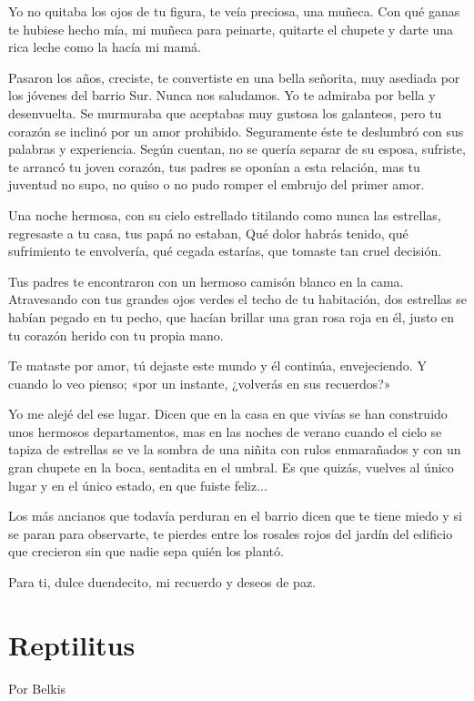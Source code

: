 \documentclass[11pt,twoside,openright,a5paper]{book}
\begin{document}
Yo no quitaba los ojos de tu figura, te veía preciosa, una muñeca. Con qué ganas te hubiese hecho mía, mi muñeca para peinarte, quitarte el chupete y darte una rica leche como la hacía mi mamá.

Pasaron los años, creciste, te convertiste en  una bella señorita, muy asediada por los jóvenes del barrio Sur. Nunca nos saludamos. Yo te admiraba por bella y desenvuelta. Se murmuraba que aceptabas muy gustosa los galanteos, pero tu corazón se inclinó por un amor prohibido. Seguramente éste te deslumbró con sus palabras y experiencia. Según cuentan, no se quería separar de su esposa, sufriste, te arrancó tu joven corazón, tus padres se oponían a esta relación, mas tu juventud no supo, no quiso o no pudo romper el embrujo del primer amor.

Una noche hermosa, con su cielo estrellado titilando como nunca las estrellas, regresaste a tu casa, tus papá no estaban, Qué dolor habrás tenido, qué sufrimiento te envolvería, qué cegada estarías, que tomaste tan cruel decisión.

Tus padres te encontraron con un hermoso camisón blanco en la cama. Atravesando con tus grandes ojos verdes el techo de tu habitación, dos estrellas se habían pegado en tu pecho, que hacían brillar una gran rosa roja en él, justo en tu corazón herido con tu propia mano.

Te mataste por amor, tú dejaste este mundo y él continúa, envejeciendo. Y cuando lo veo pienso; «por un instante, ¿volverás en sus recuerdos?»

Yo me  alejé del ese lugar. Dicen que en la casa en que vivías se han construido unos hermosos departamentos, mas en las noches de verano cuando el cielo se tapiza de estrellas se ve la sombra de una niñita con rulos enmarañados y con un gran chupete en la boca, sentadita en el umbral. Es que quizás, vuelves al único lugar y en el único estado, en que fuiste feliz...

Los más ancianos que todavía perduran en el barrio dicen que te tiene miedo y si se paran para observarte, te pierdes entre los rosales rojos del jardín del edificio que crecieron sin que nadie sepa quién los plantó.

Para ti, dulce duendecito, mi recuerdo y deseos de paz.      

\section*{Reptilitus}

                                                                                                     \begin{flushright}Por Belkis\end{flushright}
\end{document}
